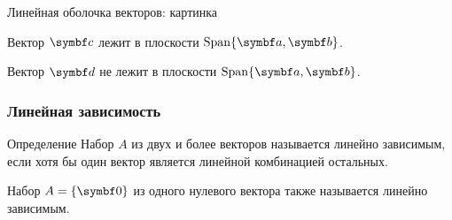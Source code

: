 \begin{frame}{Линейная оболочка векторов: картинка}
\begin{center}
  \end{center}
  
Вектор $\bc$ лежит в плоскости $\Span\{ \ba, \bb \}$.

Вектор $\bd$ не лежит в плоскости $\Span\{ \ba, \bb \}$.


\end{frame}



\begin{frame}
\frametitle{Линейная зависимость}


\begin{block}{Определение}
Набор $A$ из двух и более векторов называется 
\alert{линейно зависимым}, если хотя бы один вектор является линейной комбинацией остальных.


Набор $A = \{\bzero\}$ из одного нулевого вектора также называется \alert{линейно зависимым}.
\end{block}


\end{frame}


